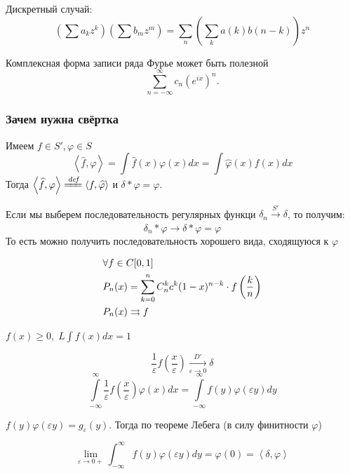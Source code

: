 \begin{unnecessary}
\begin{example}
    Дискретный случай: 
    \[ \left(\sum a_k z^k \right) \left(\sum b_m z^m \right) = \sum_n \left(\sum_k a(k) b(n-k) \right) z^n\]
\end{example}

\begin{example}
    Комплексная форма записи ряда Фурье может быть полезной \[\sum\limits_{n=-\infty}^{\infty} c_n (e^{ix})^n.\]
\end{example}

\subsubsection{Зачем нужна свёртка}

Имеем  $f \in S', \varphi \in S$
\[
\left\langle \widehat{f}, \varphi \right\rangle = \int \widehat{f}(x) \varphi(x) dx = \int \widehat{\varphi}(x) f(x) dx
\]
Тогда \(\left\langle \widehat{f}, \varphi \right\rangle \xlongequal[]{\textit{def}} \left\langle f, \widehat{\varphi} \right\rangle\) и $\delta * \varphi = \varphi$.

Если мы выберем последовательность регулярных функци $\delta_n \xrightarrow[]{S'} \delta$, то получим:
\[ \delta_n * \varphi \to \delta * \varphi = \varphi \]
То есть можно получить последовательность хорошего вида, сходящуюся к $\varphi$

\begin{note}
    \begin{align*}
        &\forall f \in C[0, 1] \\
        &P_n(x) = \sum_{k = 0}^n C^k_n c^k (1-x)^{n - k} \cdot f\left(\frac{k}{n}\right)\\
        &P_n(x) \rightrightarrows f
    \end{align*}
\end{note}

\begin{example}
    $f(x)\geq 0, \; L\int f(x)dx=1$

    \[ \frac{1}{\varepsilon} f \left(\frac{x}{\varepsilon} \right) \xrightarrow[\varepsilon \to 0]{D'} \delta\]
    \[ \int\limits_{-\infty}^{\infty} \frac{1}{\varepsilon} f\left(\frac{x}{\varepsilon} \right) \varphi(x) dx = \int\limits_{-\infty}^{\infty} f(y) \varphi(\varepsilon y) dy\]

    \( f(y)\varphi(\varepsilon y) = g_\varepsilon (y) \). Тогда по теореме Лебега (в силу финитности $\varphi$)

    \[ \lim\limits_{\varepsilon \to 0+} \int_{-\infty}^{\infty} f(y) \varphi(\varepsilon y) dy = \varphi(0) = \left\langle \delta, \varphi \right\rangle\]
\end{example}
\end{unnecessary}

